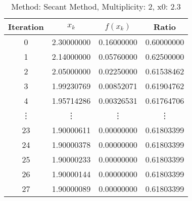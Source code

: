 \begin{table}
\centering
\caption{Method: Secant Method, Multiplicity: 2, x0: 2.3}
\label{tab:table_Secant_Method_2_2_3}
\begin{tabular}{c c c c}
\toprule
Iteration &      $x_k$ &   $f(x_k)$ &      Ratio \\
\midrule
        0 & 2.30000000 & 0.16000000 & 0.60000000 \\
        1 & 2.14000000 & 0.05760000 & 0.62500000 \\
        2 & 2.05000000 & 0.02250000 & 0.61538462 \\
        3 & 1.99230769 & 0.00852071 & 0.61904762 \\
        4 & 1.95714286 & 0.00326531 & 0.61764706 \\
   \vdots &     \vdots &     \vdots &     \vdots \\
       23 & 1.90000611 & 0.00000000 & 0.61803399 \\
       24 & 1.90000378 & 0.00000000 & 0.61803399 \\
       25 & 1.90000233 & 0.00000000 & 0.61803399 \\
       26 & 1.90000144 & 0.00000000 & 0.61803399 \\
       27 & 1.90000089 & 0.00000000 & 0.61803399 \\
\bottomrule
\end{tabular}
\end{table}
